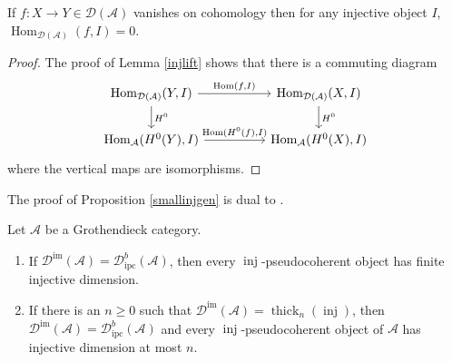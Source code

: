 \documentclass[12pt,oneside]{amsart}
\DeclareMathOperator{\Hom}{Hom}
\DeclareMathOperator{\thick}{thick}
\DeclareMathOperator{\inj}{inj}
\DeclareMathOperator{\immac}{im}
\DeclareMathOperator{\ipscoh}{ipc}
\begin{document}
\begin{lemma} \label{vanishinj}
If $f\colon X \to Y \in \mathcal{D}(\mathcal{A})$ vanishes on cohomology then for any injective object $I$,  $\Hom_{\mathcal{D}(\mathcal{A})}(f,I) = 0$.
\end{lemma}

\begin{proof}
The proof of Lemma \ref{injlift} shows that there is a commuting diagram
\[
\begin{tikzcd}[column sep = huge]
\Hom_{\mathcal{D}(\mathcal{A})}(Y,I) \arrow[r,"{\Hom(f,I)}"] \arrow[d,"H^0"] &  \Hom_{\mathcal{D}(\mathcal{A})}(X,I) \arrow[d,"H^0"] \\
\Hom_{\mathcal{A}}(H^0(Y),I) \arrow[r,"{\Hom(H^0(f),I)}"] & \Hom_{\mathcal{A}}(H^0(X),I)
\end{tikzcd}
\]
where the vertical maps are isomorphisms.
\end{proof}

The proof of Proposition \ref{smallinjgen} is dual to \cite[Proposition A.1]{Kra24b}.

\begin{prop} \label{smallinjgen} Let $\mathcal{A}$ be a Grothendieck category.
\begin{enumerate}
\item If $\mathcal{D}^{\immac}(\mathcal{A}) = \mathcal{D}^b_{\ipscoh}(\mathcal{A})$, then every $\inj$-pseudocoherent object has finite injective dimension. 


\item If there is an $n \geq 0$ such that $\mathcal{D}^{\immac}(\mathcal{A}) = \thick_n(\inj)$, then $\mathcal{D}^{\immac}(\mathcal{A}) = \mathcal{D}^b_{\ipscoh}(\mathcal{A})$ and every $\inj$-pseudocoherent object of $\mathcal{A}$ has injective dimension at most $n$. 
\end{enumerate}
\end{prop}
\end{document}
